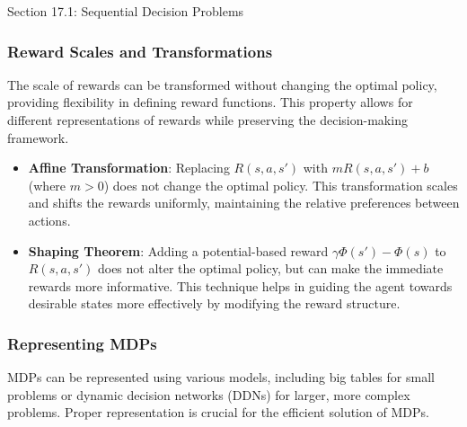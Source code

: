 \begin{notes}{Section 17.1: Sequential Decision Problems}
\begin{highlight}
    \end{highlight}
    
    \subsubsection*{Reward Scales and Transformations}
    
    The scale of rewards can be transformed without changing the optimal policy, providing flexibility in defining reward functions. This property allows for different representations of rewards while 
    preserving the decision-making framework.
    
    \begin{highlight}
    
        \begin{itemize}
            \item \textbf{Affine Transformation}: Replacing \(R(s, a, s')\) with \(mR(s, a, s') + b\) (where \(m > 0\)) does not change the optimal policy. This transformation scales and shifts the rewards 
            uniformly, maintaining the relative preferences between actions.
            \item \textbf{Shaping Theorem}: Adding a potential-based reward \(\gamma \Phi(s') - \Phi(s)\) to \(R(s, a, s')\) does not alter the optimal policy, but can make the immediate rewards more 
            informative. This technique helps in guiding the agent towards desirable states more effectively by modifying the reward structure.
        \end{itemize}
    
    \end{highlight}
    
    \subsubsection*{Representing MDPs}
    
    MDPs can be represented using various models, including big tables for small problems or dynamic decision networks (DDNs) for larger, more complex problems. Proper representation is crucial for 
    the efficient solution of MDPs.
    
    \begin{highlight}
    

\end{highlight}
\end{notes}

